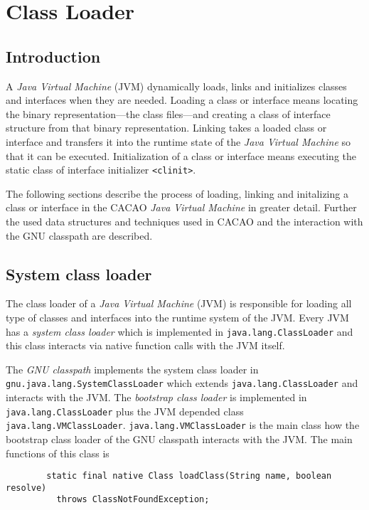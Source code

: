 \chapter{Class Loader}


\section{Introduction}

A \textit{Java Virtual Machine} (JVM) dynamically loads, links and
initializes classes and interfaces when they are needed. Loading a
class or interface means locating the binary representation---the
class files---and creating a class of interface structure from that
binary representation. Linking takes a loaded class or interface and
transfers it into the runtime state of the \textit{Java Virtual
Machine} so that it can be executed. Initialization of a class or
interface means executing the static class of interface initializer
\texttt{<clinit>}.

The following sections describe the process of loading, linking and
initalizing a class or interface in the CACAO \textit{Java Virtual
Machine} in greater detail. Further the used data structures and
techniques used in CACAO and the interaction with the GNU classpath
are described.


\section{System class loader}

The class loader of a \textit{Java Virtual Machine} (JVM) is
responsible for loading all type of classes and interfaces into the
runtime system of the JVM. Every JVM has a \textit{system class
loader} which is implemented in \texttt{java.lang.ClassLoader} and
this class interacts via native function calls with the JVM itself.

\begingroup
{}
The \textit{GNU classpath} implements the system class loader in
\texttt{gnu.java.lang.SystemClassLoader} which extends
\texttt{java.lang.ClassLoader} and interacts with the JVM. The
\textit{bootstrap class loader} is implemented in
\texttt{java.lang.ClassLoader} plus the JVM depended class
\texttt{java.lang.VMClassLoader}. \texttt{java.lang.VMClassLoader} is
the main class how the bootstrap class loader of the GNU classpath
interacts with the JVM. The main functions of this class is

\endgroup

\begin{verbatim}
        static final native Class loadClass(String name, boolean resolve)
          throws ClassNotFoundException;
\end{verbatim}

